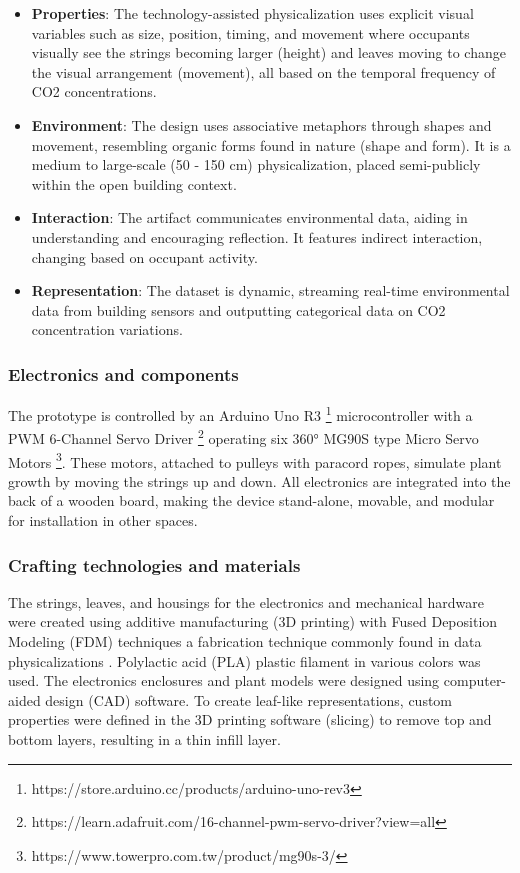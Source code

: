 \begin{itemize}
  \item \textbf{Properties}: The technology-assisted physicalization uses explicit visual variables such as size, position, timing, and movement where occupants visually see the strings becoming larger (height) and leaves moving to change the visual arrangement (movement), all based on the temporal frequency of CO2 concentrations.
  \item \textbf{Environment}: The design uses associative metaphors through shapes and movement, resembling organic forms found in nature (shape and form). It is a medium to large-scale (50 - 150 cm) physicalization, placed semi-publicly within the open building context.
  \item \textbf{Interaction}: The artifact communicates environmental data, aiding in understanding and encouraging reflection. It features indirect interaction, changing based on occupant activity.
  \item \textbf{Representation}: The dataset is dynamic, streaming real-time environmental data from building sensors and outputting categorical data on CO2 concentration variations.
\end{itemize}

\subsubsection{Electronics and components}

The prototype is controlled by an Arduino Uno R3 \footnote{https://store.arduino.cc/products/arduino-uno-rev3} microcontroller with a PWM 6-Channel Servo Driver \footnote{https://learn.adafruit.com/16-channel-pwm-servo-driver?view=all} operating six 360° MG90S type Micro Servo Motors \footnote{https://www.towerpro.com.tw/product/mg90s-3/}. These motors, attached to pulleys with paracord ropes, simulate plant growth by moving the strings up and down. All electronics are integrated into the back of a wooden board, making the device stand-alone, movable, and modular for installation in other spaces.

\subsubsection{Crafting technologies and materials}
The strings, leaves, and housings for the electronics and mechanical hardware were created using additive manufacturing (3D printing) with Fused Deposition Modeling (FDM) techniques a fabrication technique commonly found in data physicalizations \cite{anhalt_university_germany_design_2022}. Polylactic acid (PLA) plastic filament in various colors was used. The electronics enclosures and plant models were designed using computer-aided design (CAD) software. To create leaf-like representations, custom properties were defined in the 3D printing software (slicing) to remove top and bottom layers, resulting in a thin infill layer.

